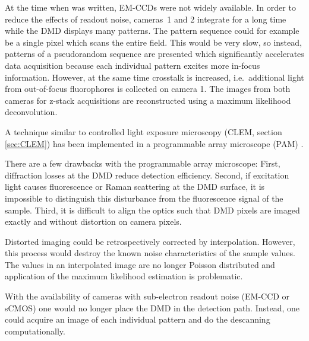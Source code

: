 At the time when \cite{Heintzmann2001a} was written, EM-CCDs were not
widely available. In order to reduce the effects of readout noise,
cameras~1 and 2 integrate for a long time while the DMD displays many
patterns. The pattern sequence could for example be a single pixel
which scans the entire field. This would be very slow, so instead,
patterns of a pseudorandom sequence are presented which significantly
accelerates data acquisition because each individual pattern excites
more in-focus information. However, at the same time crosstalk is
increased, i.e.\ additional light from out-of-focus fluorophores is
collected on camera 1.  The images from both cameras for z-stack
acquisitions are reconstructed using a maximum likelihood
deconvolution.

A technique similar to controlled light exposure microscopy (CLEM,
section \ref{sec:CLEM}) has been implemented in a programmable array
microscope (PAM) \citep{Caarls2011}. 


There are a few drawbacks with the programmable array microscope:
First, diffraction losses at the DMD reduce detection
efficiency. Second, if excitation light causes fluorescence or Raman
scattering at the DMD surface, it is impossible to distinguish this
disturbance from the fluorescence signal of the sample. Third, it is
difficult to align the optics such that DMD pixels are imaged exactly
and without distortion on camera pixels.

Distorted imaging could be retrospectively corrected by
interpolation. However, this process would destroy the known noise
characteristics of the sample values. The values in an interpolated
image are no longer Poisson distributed and application of the maximum
likelihood estimation is problematic.

With the availability of cameras with sub-electron readout noise
(EM-CCD or sCMOS) one would no longer place the DMD in the detection
path. Instead, one could acquire an image of each individual pattern
and do the descanning computationally.


%
%
%
